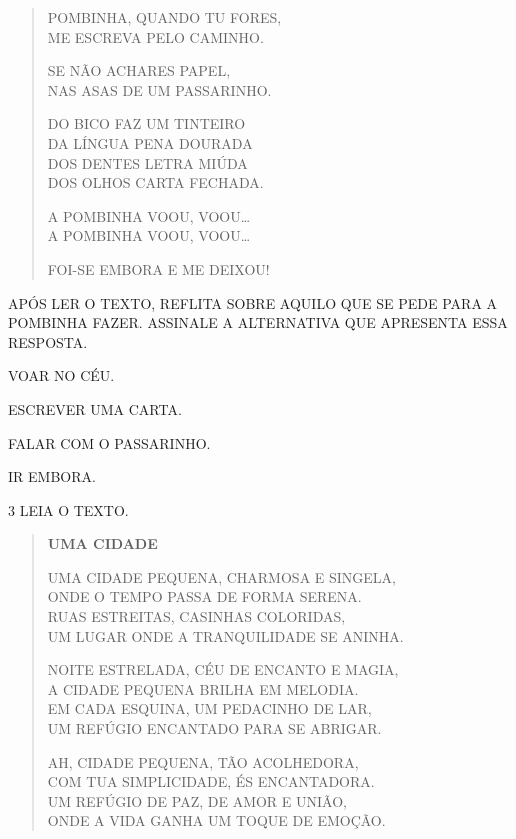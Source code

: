 \begin{myquote}
\begin{verse}
POMBINHA, QUANDO TU FORES,\\
ME ESCREVA PELO CAMINHO.

SE NÃO ACHARES PAPEL,\\
NAS ASAS DE UM PASSARINHO.

DO BICO FAZ UM TINTEIRO\\
DA LÍNGUA PENA DOURADA\\
DOS DENTES LETRA MIÚDA\\
DOS OLHOS CARTA FECHADA.

\Large{A POMBINHA VOOU, VOOU\ldots{}}\\
\Large{A POMBINHA VOOU, VOOU\ldots{}}

\large{FOI-SE EMBORA E ME DEIXOU!}
\end{verse}

\end{myquote}

APÓS LER O TEXTO, REFLITA SOBRE AQUILO QUE SE PEDE PARA
A POMBINHA FAZER. ASSINALE A ALTERNATIVA QUE APRESENTA
ESSA RESPOSTA.

\begin{escolha}
\item VOAR NO CÉU.

\item ESCREVER UMA CARTA.

\item FALAR COM O PASSARINHO.

\item IR EMBORA. 
\end{escolha}

\pagebreak
\num{3} LEIA O TEXTO.

\begin{myquote}
\begin{verse}
\textbf{UMA CIDADE}

UMA CIDADE PEQUENA, CHARMOSA E SINGELA,\\
ONDE O TEMPO PASSA DE FORMA SERENA.\\
RUAS ESTREITAS, CASINHAS COLORIDAS,\\
UM LUGAR ONDE A TRANQUILIDADE SE ANINHA.


NOITE ESTRELADA, CÉU DE ENCANTO E MAGIA,\\
A CIDADE PEQUENA BRILHA EM MELODIA.\\
EM CADA ESQUINA, UM PEDACINHO DE LAR,\\
UM REFÚGIO ENCANTADO PARA SE ABRIGAR.


AH, CIDADE PEQUENA, TÃO ACOLHEDORA,\\
COM TUA SIMPLICIDADE, ÉS ENCANTADORA.\\
UM REFÚGIO DE PAZ, DE AMOR E UNIÃO,\\
ONDE A VIDA GANHA UM TOQUE DE EMOÇÃO.
\end{verse}

\end{myquote}

